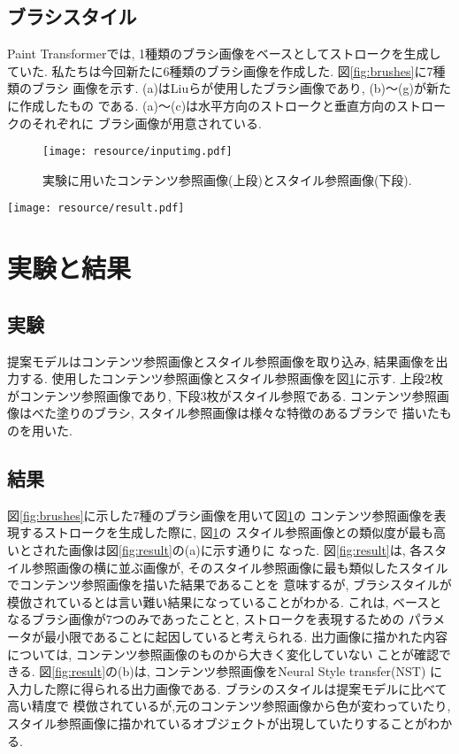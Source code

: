 \documentclass[MIRU,submit,uplatex]{miru2023j}
\begin{document}
\subsection{ブラシスタイル}
Paint Transformerでは, 1種類のブラシ画像をベースとしてストロークを生成していた.
私たちは今回新たに6種類のブラシ画像を作成した. 図\ref{fig:brushes}に7種類のブラシ
画像を示す. (a)はLiuらが使用したブラシ画像であり, (b)～(g)が新たに作成したもの
である. (a)～(c)は水平方向のストロークと垂直方向のストロークのそれぞれに
ブラシ画像が用意されている. 


\begin{figure}
    \centering
    \texttt{[image: resource/inputimg.pdf]}
    \caption{実験に用いたコンテンツ参照画像(上段)とスタイル参照画像(下段).}
    \label{fig:inputs}
\end{figure}

\begin{figure*}[t]
    \centering
    \texttt{[image: resource/result.pdf]}
    \caption{(a)モデルに入力したスタイル参照画像と提案モデルからの出力画像.
    (b)Neural Style Transferによる実行結果.}
    \label{fig:result}
\end{figure*}

\section{実験と結果}

\subsection{実験}
提案モデルはコンテンツ参照画像とスタイル参照画像を取り込み, 結果画像を出力する.
使用したコンテンツ参照画像とスタイル参照画像を図\ref{fig:inputs}に示す.
上段2枚がコンテンツ参照画像であり, 下段3枚がスタイル参照である.
コンテンツ参照画像はべた塗りのブラシ, スタイル参照画像は様々な特徴のあるブラシで
描いたものを用いた.

\subsection{結果}
図\ref{fig:brushes}に示した7種のブラシ画像を用いて図\ref{fig:inputs}の
コンテンツ参照画像を表現するストロークを生成した際に, 図\ref{fig:inputs}の
スタイル参照画像との類似度が最も高いとされた画像は図\ref{fig:result}の(a)に示す通りに
なった. 図\ref{fig:result}は, 各スタイル参照画像の横に並ぶ画像が, 
そのスタイル参照画像に最も類似したスタイルでコンテンツ参照画像を描いた結果であることを
意味するが, ブラシスタイルが模倣されているとは言い難い結果になっていることがわかる. 
これは, ベースとなるブラシ画像が7つのみであったことと, ストロークを表現するための
パラメータが最小限であることに起因していると考えられる.
出力画像に描かれた内容については, コンテンツ参照画像のものから大きく変化していない
ことが確認できる.
図\ref{fig:result}の(b)は, コンテンツ参照画像をNeural Style transfer(NST) \cite{IST}
に入力した際に得られる出力画像である. ブラシのスタイルは提案モデルに比べて高い精度で
模倣されているが,元のコンテンツ参照画像から色が変わっていたり, 
スタイル参照画像に描かれているオブジェクトが出現していたりすることがわかる.
\end{document}
